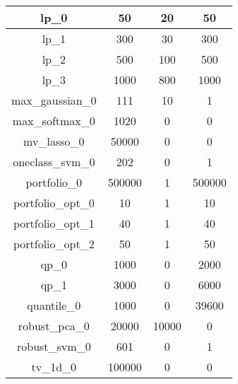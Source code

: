 \begin{figure}[h]
\begin{tabular}{| c | c | c | c |}
\hline 
lp_0 & 50 & 20 & 50 \\ 
\hline 
lp_1 & 300 & 30 & 300 \\ 
\hline 
lp_2 & 500 & 100 & 500 \\ 
\hline 
lp_3 & 1000 & 800 & 1000 \\ 
\hline 
max_gaussian_0 & 111 & 10 & 1 \\ 
\hline 
max_softmax_0 & 1020 & 0 & 0 \\ 
\hline 
mv_lasso_0 & 50000 & 0 & 0 \\ 
\hline 
oneclass_svm_0 & 202 & 0 & 1 \\ 
\hline 
portfolio_0 & 500000 & 1 & 500000 \\ 
\hline 
portfolio_opt_0 & 10 & 1 & 10 \\ 
\hline 
portfolio_opt_1 & 40 & 1 & 40 \\ 
\hline 
portfolio_opt_2 & 50 & 1 & 50 \\ 
\hline 
qp_0 & 1000 & 0 & 2000 \\ 
\hline 
qp_1 & 3000 & 0 & 6000 \\ 
\hline 
quantile_0 & 1000 & 0 & 39600 \\ 
\hline 
robust_pca_0 & 20000 & 10000 & 0 \\ 
\hline 
robust_svm_0 & 601 & 0 & 1 \\ 
\hline 
tv_1d_0 & 100000 & 0 & 0 \\ 
\hline 
\end{tabular}
\end{figure}
